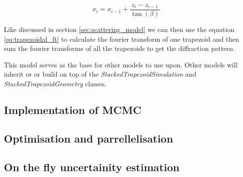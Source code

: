 \medskip

\begin{equation}
    x_{i} = x_{i-1} + \frac{z_{i} - z_{i-1}}{\tan(\beta)}
\end{equation}

\medskip

Like discussed in section \ref{sec:scattering_model} we can then use the equation \ref{eq:trapezoidal_ft} to calculate
the fourier transform of one trapezoid and then sum the fourier transforms of all the 
trapezoids to get the diffraction pattern.

This model serves as the base for other models to use upon. Other models will inherit 
or or build on top of the \textit{StackedTrapezoidSimulation} and \textit{StackedTrapezoidGeometry} classes.




\FloatBarrier



\subsection{Implementation of MCMC}
\subsection{Optimisation and parrellelisation}
\subsection{On the fly uncertainity estimation}
